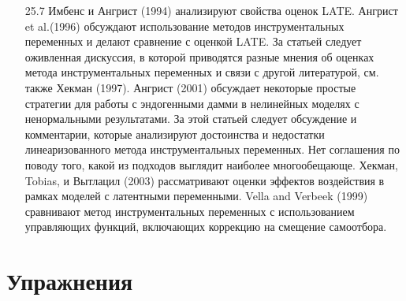 \begin{enumerate}
\item[25.7] Имбенс и Ангрист (1994) анализируют свойства оценок LATE. Ангрист et al.(1996) обсуждают использование методов инструментальных переменных и делают сравнение с оценкой LATE. За статьей следует оживленная дискуссия, в которой приводятся разные мнения об оценках метода инструментальных переменных и связи с другой литературой, см. также Хекман (1997). Ангрист (2001) обсуждает некоторые простые стратегии для работы с эндогенными дамми в нелинейных моделях с ненормальными результатами. За этой статьей следует обсуждение и комментарии, которые анализируют достоинства и недостатки линеаризованного метода инструментальных переменных. Нет соглашения по поводу того, какой из подходов выглядит наиболее многообещающе. Хекман, Tobias, и Вытлацил (2003) рассматривают оценки эффектов воздействия в рамках моделей с латентными переменными. Vella and Verbeek (1999) сравнивают метод инструментальных переменных с использованием управляющих функций, включающих коррекцию на смещение самоотбора. 
\end{enumerate}

\section*{Упражнения}

